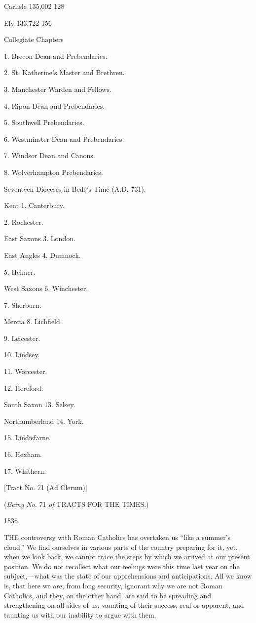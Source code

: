 Carlisle
135,002
128

Ely
133,722
156

Collegiate Chapters

1. Brecon
Dean and Prebendaries.

2. St. Katherine's
Master and Brethren.

3. Manchester
Warden and Fellows.

4. Ripon
Dean and Prebendaries.

5. Southwell
Prebendaries.

6. Westminster
Dean and Prebendaries.

7. Windsor
Dean and Canons.

8. Wolverhampton
Prebendaries.

Seventeen Dioceses in Bede's Time
(A.D. 731).

Kent
1. Canterbury.

2. Rochester.

East Saxons
3. London.

East Angles
4. Dumnock.

5. Helmer.

West Saxons
6. Winchester.

7. Sherburn.

Mercia
8. Lichfield.

9. Leicester.

10. Lindsey.

11. Worcester.

12. Hereford.

South Saxon
13. Selsey.

Northumberland
14. York.

15. Lindisfarne.

16. Hexham.

17. Whithern.


[Tract No. 71 (Ad Clerum)]

(\emph{Being
No}. 71 \emph{of} TRACTS FOR THE TIMES.)

1836.


THE
controversy with Roman Catholics has overtaken us ``like a summer's
cloud.'' We find ourselves in various parts of the country preparing
for it, yet, when we look back, we cannot trace the steps by which we
arrived at our present position. We do not recollect what our feelings
were this time last year on the subject,—what was the state of our
apprehensions and anticipations. All we know is, that here we are,
from long security, ignorant why we are not Roman Catholics, and they,
on the other hand, are said to be spreading and strengthening on all
sides of us, vaunting of their success, real or apparent, and taunting
us with our inability to argue with them.


